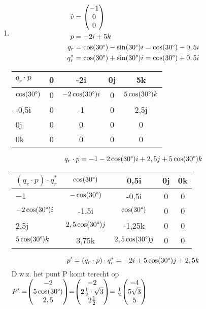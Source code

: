 \begin{enumerate}
	\item
    \begin{align*}
        \hat{v} &= \begin{pmatrix} -1 \\ 0 \\ 0 \end{pmatrix} \\
              p &= -2i +5k   \\
    	  q_r &= \cos(30 \degree) -\sin(30 \degree)i = \cos(30 \degree) - 0,5i \\
    	 q^*_r &= \cos(30 \degree) + \sin(30 \degree)i = \cos(30 \degree) + 0,5i
    \end{align*}
	\begin{NiceTabular}{ | a | c | c | c | c |}
		\hline
         \RowStyle{\color{white}} %
		$ q_r\cdot p $ & 0 & -2i   & 0j & 5k \\ \hline
		$\cos(30 \degree)   $  & 0 &  $-2\cos(30 \degree) i  $
		&   0    &  $5\cos(30 \degree) k  $ \\ ,5i   & 0 &  -1  &   0       & 2,5j  \\ \hline
		0j   & 0 &  0 &   0    & 0\\ \hline
		0k    & 0  & 0   & 0  & 0\\ 
		\hline 
	\end{NiceTabular}
	\[q_r\cdot p = -1 -2\cos(30 \degree)i  + 2,5j + 5\cos(30 \degree)k\]
	\begin{NiceTabular}{ | a | c | c | c | c |}
		\hline
         \RowStyle{\color{white}} %
		$ (q_r\cdot p)\cdot q^*_r $ & $ \cos( 30 \degree)  $ & 0,5i   & 0j & 0k \\ \hline 
		$-1   $   &  $-\cos(30 \degree)  $ & -0,5i	&   0    &  0 \\ \hline
		$ -2\cos(30 \degree) i  $ & -1,5i &  $ \cos(30 \degree)  $  &0&0\\ ,5j   & $ 2,5\cos(30 \degree) j  $ &  -1,25k &   0    & 0\\ \hline
		$ 5\cos(30 \degree) k  $    & 3,75k  & $ 2,5\cos(30 \degree) j  $    & 0  & 0\\ 
		\hline 
	\end{NiceTabular}
	\[p' = (q_r\cdot p)\cdot q^*_r = -2i + 5\cos(30 \degree) j  + 2,5k\]
	D.w.z. het punt P komt terecht op $ P' = \vecdrie{-2}{5\cos(30 \degree)}{2,5}
	= \vecdrie{-2}{2\frac{1}{2}\cdot \sqrt{3}}{2\frac{1}{2}} = \frac{1}{2}\vecdrie{-4}{5\sqrt{3}}{5} $
	
	
	
\end{enumerate}

